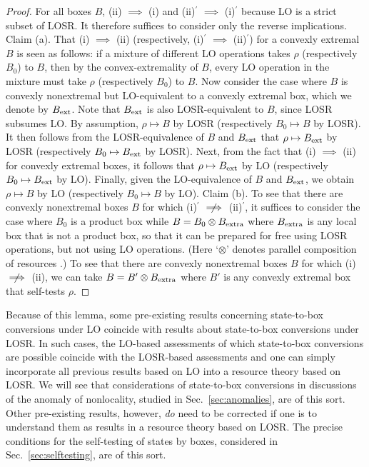 \documentclass[prx,11pt,letterpaper,twocolumn,accepted=2023-11-27]{quantumarticle}
\theoremstyle{plain}
\theoremstyle{definition}
\newcommand{\nimplies}{\centernot{\implies}}
\begin{document}
\begin{proof}
 For all boxes $B$,  (ii) $\implies$ (i) and (ii)$^{\prime}$ $\implies$ (i)$^{\prime}$ because LO is a strict subset of LOSR.  It therefore suffices to consider only the reverse implications.
Claim (a).  That (i) $\implies$ (ii) (respectively, (i)$^{\prime}$ $\implies$ (ii)$^{\prime}$) for a convexly extremal $B$ is seen as follows: if a mixture of different LO operations takes $\rho$ (respectively $B_0$) to $B$, then by the convex-extremality of $B$, every LO operation in the mixture must take $\rho$ (respectively $B_0$) to $B$.   Now consider the case where $B$ is convexly nonextremal but LO-equivalent to a convexly extremal box, which we denote by $B_{\rm ext}$.
Note that $B_{\rm ext}$ is also LOSR-equivalent to $B$, since LOSR subsumes LO.  By assumption, $\rho \mapsto B$ by LOSR (respectively $B_0 \mapsto B$ by LOSR).  It then follows from the LOSR-equivalence of 
$B$ and $B_{\rm ext}$  that $\rho \mapsto B_{\rm ext}$ by LOSR (respectively $B_0 \mapsto B_{\rm ext}$ by LOSR).  Next, from the fact that  (i) $\implies$ (ii) for convexly extremal boxes, it follows that $\rho \mapsto B_{\rm ext}$ by LO (respectively $B_0 \mapsto B_{\rm ext}$ by LO).  Finally, given the LO-equivalence of $B$ and $B_{\rm ext}$, we obtain $\rho \mapsto B$ by LO (respectively $B_0 \mapsto B$ by LO).   Claim (b).  To see that there are convexly nonextremal boxes $B$ for which  (i)$^{\prime}$ $\nimplies$ (ii)$^{\prime}$, it suffices to consider the case where $B_0$ is a product box  while $B = B_0  \otimes B_{\rm extra}$ where 
$B_{\rm extra}$ is any local box that is not a product box, so that it can be prepared for free using LOSR operations, but not using LO operations. (Here `$\otimes$' denotes parallel composition of resources \cite{coecke2016mathematical}.) To see that there are convexly nonextremal boxes $B$ for which (i) $\nimplies$ (ii), we can take  $B = B'  \otimes B_{\rm extra}$ where $B'$ is any convexly extremal box that self-tests $\rho$.
\end{proof}


Because of this lemma, some pre-existing results concerning state-to-box conversions under LO coincide with results about state-to-box conversions under LOSR.  In such cases, the LO-based assessments of which state-to-box conversions are possible coincide with the LOSR-based assessments and one can simply incorporate all previous results based on LO  into a resource theory based on LOSR. 
We will see that considerations of state-to-box conversions in discussions of the anomaly of nonlocality, studied in Sec.~\ref{sec:anomalies}, are of this sort.  Other pre-existing results, however, {\em do} need to be corrected if one is to understand them as results in a resource theory based on LOSR. 
  The precise conditions for the self-testing of states by boxes, considered in Sec.~\ref{sec:selftesting}, are of this sort.\\
\end{document}
